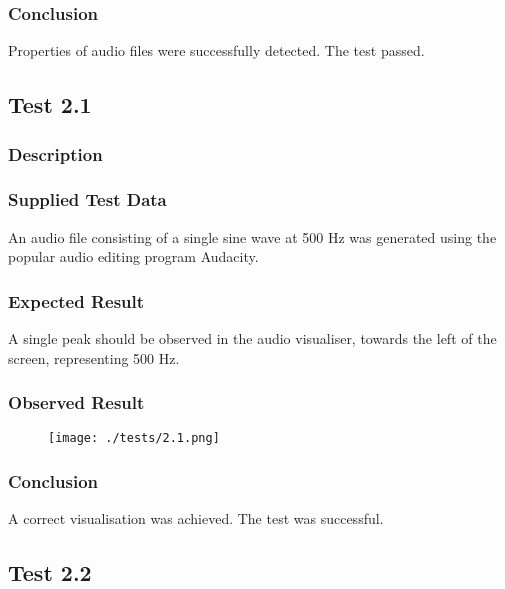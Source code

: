 \subsubsection*{Conclusion}
Properties of audio files were successfully detected. The test passed.

\pagebreak
\subsection{Test 2.1}
\subsubsection*{Description}
\paragraph{}
{
	\centering
}

\subsubsection*{Supplied Test Data}
An audio file consisting of a single sine wave at 500 Hz was generated using the popular audio editing program Audacity.

\subsubsection*{Expected Result}
A single peak should be observed in the audio visualiser, towards the left of the screen, representing 500 Hz.

\subsubsection*{Observed Result}
\label{sec:evidence2.1}
\begin{figure}[H]
	\texttt{[image: ./tests/2.1.png]}
\end{figure}

\subsubsection*{Conclusion}
A correct visualisation was achieved. The test was successful.

\pagebreak
\subsection{Test 2.2}
